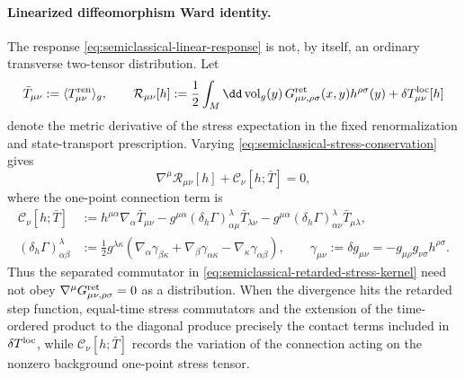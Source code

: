 \paragraph{Linearized diffeomorphism Ward identity.}
The response \eqref{eq:semiclassical-linear-response} is not, by itself, an
ordinary transverse two-tensor distribution.  Let
\[
  \bar T_{\mu\nu}:=\langle T_{\mu\nu}^{\rm ren}\rangle_g,
  \qquad
  \mathcal R_{\mu\nu}[h]
  :=
  \frac12\int_M\dd\operatorname{vol}_g(y)\,
  G^{\rm ret}_{\mu\nu,\rho\sigma}(x,y)h^{\rho\sigma}(y)
  +
  \delta T_{\mu\nu}^{\rm loc}[h]
\]
denote the metric derivative of the stress expectation in the fixed
renormalization and state-transport prescription.  Varying
\eqref{eq:semiclassical-stress-conservation} gives
\begin{equation}
  \nabla^\mu\mathcal R_{\mu\nu}[h]
  +
  \mathcal C_\nu[h;\bar T]
  =
  0,
  \label{eq:semiclassical-linearized-stress-ward}
\end{equation}
where the one-point connection term is
\begin{equation}
\begin{aligned}
  \mathcal C_\nu[h;\bar T]
  &:=
  h^{\mu\alpha}\nabla_\alpha\bar T_{\mu\nu}
  -
  g^{\mu\alpha}
  (\delta_h\Gamma)^\lambda_{\alpha\mu}\bar T_{\lambda\nu}
  -
  g^{\mu\alpha}
  (\delta_h\Gamma)^\lambda_{\alpha\nu}\bar T_{\mu\lambda},
  \\
  (\delta_h\Gamma)^\lambda_{\alpha\beta}
  &:=
  \frac12 g^{\lambda\kappa}
  \left(
    \nabla_\alpha\gamma_{\beta\kappa}
    +
    \nabla_\beta\gamma_{\alpha\kappa}
    -
    \nabla_\kappa\gamma_{\alpha\beta}
  \right),
  \qquad
  \gamma_{\mu\nu}:=\delta g_{\mu\nu}
  =
  -g_{\mu\rho}g_{\nu\sigma}h^{\rho\sigma}.
\end{aligned}
  \label{eq:semiclassical-linearized-connection-contact}
\end{equation}
Thus the separated commutator in
\eqref{eq:semiclassical-retarded-stress-kernel} need not obey
\(\nabla^\mu G^{\rm ret}_{\mu\nu,\rho\sigma}=0\) as a distribution.  When the
divergence hits the retarded step function, equal-time stress commutators and
the extension of the time-ordered product to the diagonal produce precisely
the contact terms included in \(\delta T^{\rm loc}\), while
\(\mathcal C_\nu[h;\bar T]\) records the variation of the connection acting on
the nonzero background one-point stress tensor.

